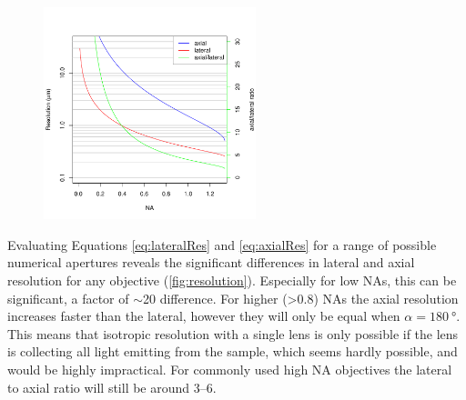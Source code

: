 
  \begin{figure}
    \centering
    \includegraphics[width=0.55\textwidth]{resolution}
    \label{fig:resolution}
  \end{figure}

  Evaluating Equations \ref{eq:lateralRes} and \ref{eq:axialRes} for a range of possible numerical apertures reveals the significant differences in lateral and axial resolution for any objective (\autoref{fig:resolution}). Especially for low NAs, this can be significant, a factor of $\sim$20 difference. For higher (>0.8) NAs the axial resolution increases faster than the lateral, however they will only be equal when $\alpha=\SI{180}{\degree}$. This means that isotropic resolution with a single lens is only possible if the lens is collecting all light emitting from the sample, which seems hardly possible, and would be highly impractical. For commonly used high NA objectives the lateral to axial ratio will still be around 3--6. 

